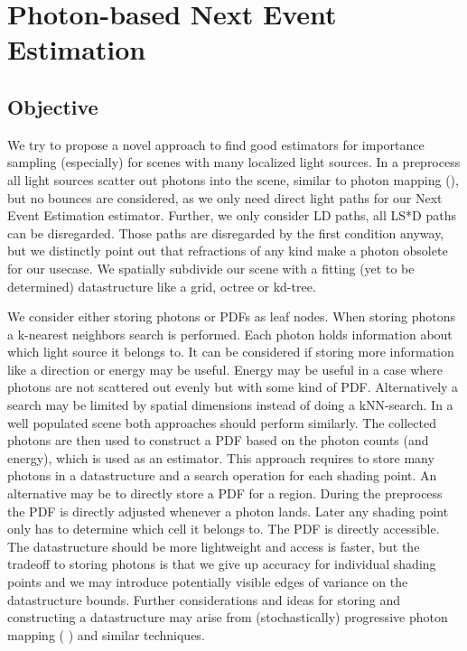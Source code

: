 \chapter{Photon-based Next Event Estimation}
\label{ch:PNEE}

\section{Objective}

We try to propose a novel approach to find good estimators for importance sampling (especially) for scenes with many localized light sources. In a preprocess all light sources scatter out photons into the scene, similar to photon mapping (\cite{jensen2001realistic}), but no bounces are considered, as we only need direct light paths for our Next Event Estimation estimator. Further, we only consider LD paths, all LS*D paths can be disregarded. Those paths are disregarded by the first condition anyway, but we distinctly point out that refractions of any kind make a photon obsolete for our usecase. We spatially subdivide our scene with a fitting (yet to be determined) datastructure like a grid, octree or kd-tree. 

We consider either storing photons or PDFs as leaf nodes. When storing photons a k-nearest neighbors search is performed. Each photon holds information about which light source it belongs to. It can be considered if storing more information like a direction or energy may be useful. Energy may be useful in a case where photons are not scattered out evenly but with some kind of PDF. Alternatively a search may be limited by spatial dimensions instead of doing a kNN-search. In a well populated scene both approaches should perform similarly. The collected photons are then used to construct a PDF based on the photon counts (and energy), which is used as an estimator. This approach requires to store many photons in a datastructure and a search operation for each shading point. An alternative may be to directly store a PDF for a region. During the preprocess the PDF is directly adjusted whenever a photon lands. Later any shading point only has to determine which cell it belongs to. The PDF is directly accessible. The datastructure should be more lightweight and access is faster, but the tradeoff to storing photons is that we give up accuracy for individual shading points and we may introduce potentially visible edges of variance on the datastructure bounds. Further considerations and ideas for storing and constructing a datastructure may arise from (stochastically) progressive photon mapping (\cite{Hachisuka2008ProgressivePM} \cite{Hachisuka2009StochasticPP}) and similar techniques.

